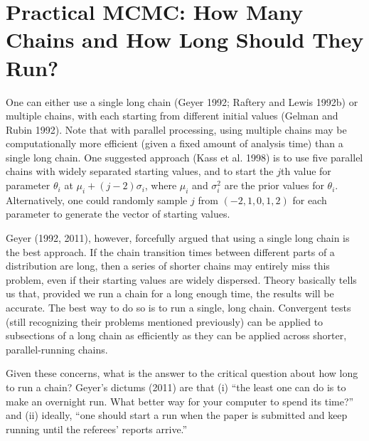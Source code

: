 \documentclass{article}
\begin{document}
\section{Practical MCMC: How Many Chains and How Long Should They Run?}
One can either use a single long chain (Geyer 1992; Raftery and Lewis 1992b) or multiple chains, with each starting from different initial values (Gelman and Rubin 1992). Note that with parallel processing, using multiple chains may be computationally more efficient (given a fixed amount of analysis time) than a single long chain. One suggested approach (Kass et al. 1998) is to use five parallel chains with widely separated starting values, and to start the  $ j $th value for parameter  $ \theta_i $ at  $ \mu_i + (j - 2)\sigma_i $, where  $ \mu_i $ and  $ \sigma_i^2 $ are the prior values for  $ \theta_i $. Alternatively, one could randomly sample  $ j $ from  $ (-2, 1, 0, 1, 2) $ for each parameter to generate the vector of starting values.

Geyer (1992, 2011), however, forcefully argued that using a single long chain is the best approach. If the chain transition times between different parts of a distribution are long, then a series of shorter chains may entirely miss this problem, even if their starting values are widely dispersed. Theory basically tells us that, provided we run a chain for a long enough time, the results will be accurate. The best way to do so is to run a single, long chain. Convergent tests (still recognizing their problems mentioned previously) can be applied to subsections of a long chain as efficiently as they can be applied across shorter, parallel-running chains.

Given these concerns, what is the answer to the critical question about how long to run a chain? Geyer's dictums (2011) are that (i) “the least one can do is to make an overnight run. What better way for your computer to spend its time?” and (ii) ideally, “one should start a run when the paper is submitted and keep running until the referees’ reports arrive.”
\end{document}
